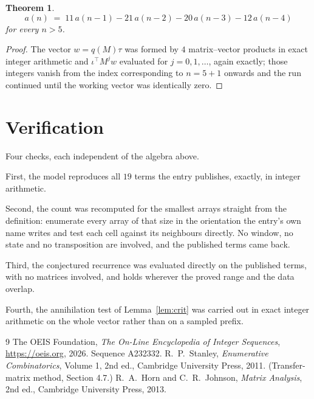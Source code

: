 \documentclass[11pt,a4paper]{article}
\theoremstyle{plain}
\newtheorem{theorem}{Theorem}
\theoremstyle{definition}
\begin{document}
\begin{theorem}
\[
a(n)\;=\;11\,a(n-1) - 21\,a(n-2) - 20\,a(n-3) - 12\,a(n-4)
\]
for every $n>5$.
\end{theorem}

\begin{proof}
The vector $w=q(M)\tau$ was formed by $4$ matrix--vector products in exact integer
arithmetic and $\iota^{\!\top}M^{j}w$ evaluated for $j=0,1,\dots$, again exactly; those
integers vanish from the index corresponding to $n=5+1$ onwards and the run continued
until the working vector was identically zero.
\end{proof}

\section{Verification}

Four checks, each independent of the algebra above.

First, the model reproduces all $19$ terms the entry publishes, exactly, in integer
arithmetic.

Second, the count was recomputed for the smallest arrays straight from the definition:
enumerate every array of that size in the orientation the entry's own name writes and test each
cell against its neighbours directly. No window, no state and no transposition are involved,
and the published terms came back.

Third, the conjectured recurrence was evaluated directly on the published terms, with no
matrices involved, and holds wherever the proved range and the data overlap.

Fourth, the annihilation test of Lemma~\ref{lem:crit} was carried out in exact integer
arithmetic on the whole vector rather than on a sampled prefix.

\begin{thebibliography}{9}
 The OEIS Foundation, \emph{The On-Line Encyclopedia of Integer
Sequences}, \url{https://oeis.org}, 2026. Sequence A232332.
 R.~P.~Stanley, \emph{Enumerative Combinatorics}, Volume 1, 2nd ed.,
Cambridge University Press, 2011. (Transfer-matrix method, Section 4.7.)
 R.~A.~Horn and C.~R.~Johnson, \emph{Matrix Analysis}, 2nd ed., Cambridge
University Press, 2013.
\end{thebibliography}
\end{document}

